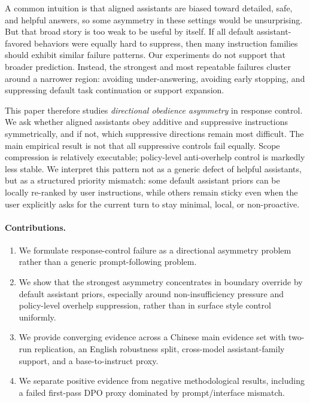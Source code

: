 \documentclass[11pt]{article}
\begin{document}
A common intuition is that aligned assistants are biased toward detailed, safe, and helpful answers, so some asymmetry in these settings would be unsurprising. But that broad story is too weak to be useful by itself. If all default assistant-favored behaviors were equally hard to suppress, then many instruction families should exhibit similar failure patterns. Our experiments do not support that broader prediction. Instead, the strongest and most repeatable failures cluster around a narrower region: avoiding under-answering, avoiding early stopping, and suppressing default task continuation or support expansion.

This paper therefore studies \emph{directional obedience asymmetry} in response control. We ask whether aligned assistants obey additive and suppressive instructions symmetrically, and if not, which suppressive directions remain most difficult. The main empirical result is not that all suppressive controls fail equally. Scope compression is relatively executable; policy-level anti-overhelp control is markedly less stable. We interpret this pattern not as a generic defect of helpful assistants, but as a structured priority mismatch: some default assistant priors can be locally re-ranked by user instructions, while others remain sticky even when the user explicitly asks for the current turn to stay minimal, local, or non-proactive.

\paragraph{Contributions.}
\begin{enumerate}[leftmargin=1.5em]
  \item We formulate response-control failure as a directional asymmetry problem rather than a generic prompt-following problem.
  \item We show that the strongest asymmetry concentrates in boundary override by default assistant priors, especially around non-insufficiency pressure and policy-level overhelp suppression, rather than in surface style control uniformly.
  \item We provide converging evidence across a Chinese main evidence set with two-run replication, an English robustness split, cross-model assistant-family support, and a base-to-instruct proxy.
  \item We separate positive evidence from negative methodological results, including a failed first-pass DPO proxy dominated by prompt/interface mismatch.
\end{enumerate}
\end{document}
